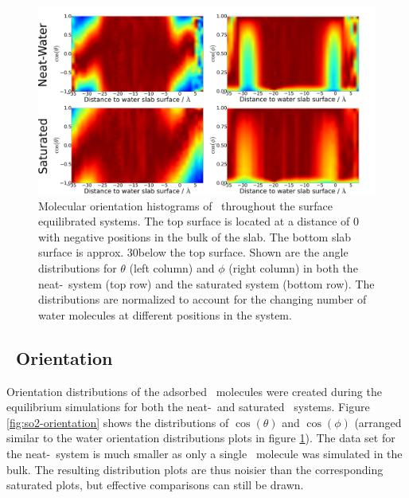 \begin{figure}[h!]
	\begin{center}
		\includegraphics[scale=1.0]{images/h2o-angles/h2oangles.png}
		\caption{Molecular orientation histograms of \wat~throughout the surface equilibrated systems. The top surface is located at a distance of 0 with negative positions in the bulk of the slab. The bottom slab surface is approx. 30\angs below the top surface. Shown are the angle distributions for $\theta$ (left column) and $\phi$ (right column) in both the neat-\wat~system (top row) and the saturated system (bottom row). The distributions are normalized to account for the changing number of water molecules at different positions in the system.}
		\label{fig:water-orientation}
	\end{center}
\end{figure}



\subsection{\suldiox~Orientation}

Orientation distributions of the adsorbed \suldiox~molecules were created during the equilibrium simulations for both the neat-\wat~and saturated \suldiox~systems. Figure \ref{fig:so2-orientation} shows the distributions of $\cos(\theta)$ and $\cos(\phi)$ (arranged similar to the water orientation distributions plots in figure \ref{fig:water-orientation}). The data set for the neat-\wat~system is much smaller as only a single \suldiox~molecule was simulated in the bulk. The resulting distribution plots are thus noisier than the corresponding saturated plots, but effective comparisons can still be drawn.

